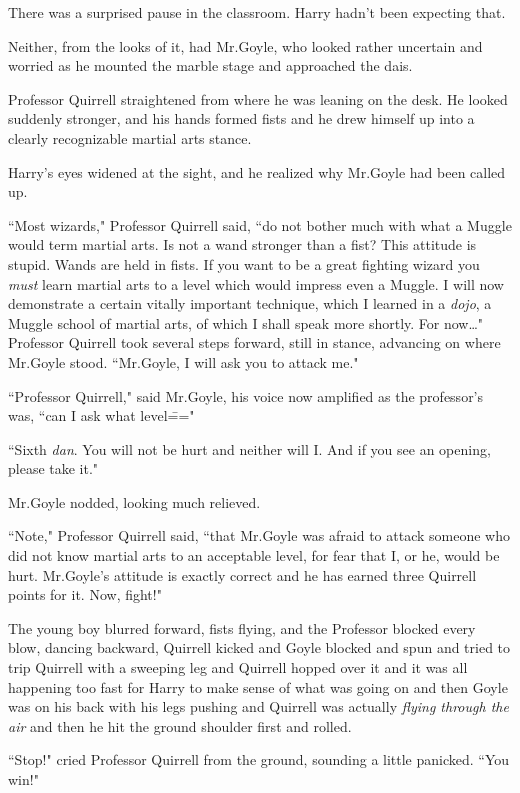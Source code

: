 There was a surprised pause in the classroom. Harry hadn't been expecting that.

Neither, from the looks of it, had Mr.\?Goyle, who looked rather uncertain and worried as he mounted the marble stage and approached the dais.

Professor Quirrell straightened from where he was leaning on the desk. He looked suddenly stronger, and his hands formed fists and he drew himself up into a clearly recognizable martial arts stance.

Harry's eyes widened at the sight, and he realized why Mr.\?Goyle had been called up.

``Most wizards," Professor Quirrell said, ``do not bother much with what a Muggle would term martial arts. Is not a wand stronger than a fist? This attitude is stupid. Wands are held in fists. If you want to be a great fighting wizard you \emph{must} learn martial arts to a level which would impress even a Muggle. I will now demonstrate a certain vitally important technique, which I learned in a \emph{dojo}, a Muggle school of martial arts, of which I shall speak more shortly. For now{\ldots}" Professor Quirrell took several steps forward, still in stance, advancing on where Mr.\?Goyle stood. ``Mr.\?Goyle, I will ask you to attack me."

``Professor Quirrell," said Mr.\?Goyle, his voice now amplified as the professor's was, ``can I ask what level\==="

``Sixth \emph{dan}. You will not be hurt and neither will I\@. And if you see an opening, please take it."

Mr.\?Goyle nodded, looking much relieved.

``Note," Professor Quirrell said, ``that Mr.\?Goyle was afraid to attack someone who did not know martial arts to an acceptable level, for fear that I, or he, would be hurt. Mr.\?Goyle's attitude is exactly correct and he has earned three Quirrell points for it. Now, fight!"

The young boy blurred forward, fists flying, and the Professor blocked every blow, dancing backward, Quirrell kicked and Goyle blocked and spun and tried to trip Quirrell with a sweeping leg and Quirrell hopped over it and it was all happening too fast for Harry to make sense of what was going on and then Goyle was on his back with his legs pushing and Quirrell was actually \emph{flying through the air} and then he hit the ground shoulder first and rolled.

``Stop!" cried Professor Quirrell from the ground, sounding a little panicked. ``You win!"


